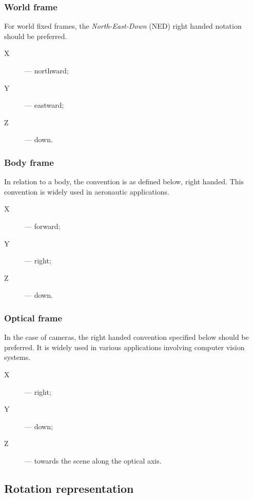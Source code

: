 \subsubsection{World frame}

For world fixed frames, the \emph{North-East-Down} (NED) right handed notation should be preferred.
\begin{samepage}
\begin{description}
    \item[X] --- northward;
    \item[Y] --- eastward;
    \item[Z] --- down.
\end{description}
\end{samepage}

\subsubsection{Body frame}

In relation to a body, the convention is as defined below, right handed.
This convention is widely used in aeronautic applications.
\begin{samepage}
\begin{description}
    \item[X] --- forward;
    \item[Y] --- right;
    \item[Z] --- down.
\end{description}
\end{samepage}

\subsubsection{Optical frame}

In the case of cameras, the right handed convention specified below should be preferred.
It is widely used in various applications involving computer vision systems.
\begin{samepage}
\begin{description}
    \item[X] --- right;
    \item[Y] --- down;
    \item[Z] --- towards the scene along the optical axis.
\end{description}
\end{samepage}

\subsection{Rotation representation}

